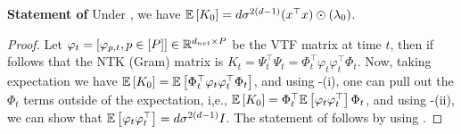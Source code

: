\textbf{Statement of }
Under , we have $\mathbb{E}\left[K_0\right]=d\sigma^{2(d-1)}(x^\top x) \odot (\lambda_0)$.

\begin{proof} Let $\varphi_t=\left[\varphi_{p,t},p\in[P]\right]\in\mathbb{R}^{d_{net}\times P}$ be the VTF matrix at time $t$, then if follows that the NTK (Gram) matrix is  $K_t=\Psi^\top_t\Psi_t=\Phi^\top_t\varphi_t\varphi^\top_t\Phi_t$. Now, taking expectation we have $\mathbb{E}\left[K_0\right]=\mathbb{E}\left[\Phi^\top_t\varphi_t\varphi^\top_t\Phi_t\right]$, and using -(i), one can pull out the $\Phi_t$ terms outside of the expectation, i,e., $\mathbb{E}\left[K_0\right]=\Phi^\top_t\mathbb{E}\left[\varphi_t\varphi^\top_t\right]\Phi_t$, and using -(ii), we can show that $\mathbb{E}\left[\varphi_t\varphi^\top_t\right]=d\sigma^{2(d-1)}I$. The statement of  follows by using .
\end{proof}


